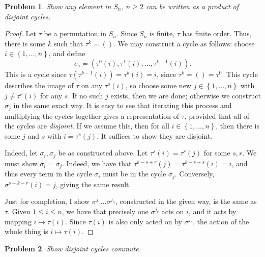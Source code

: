\documentclass[11pt, letterpaper]{article}
\theoremstyle{plain}
\newtheorem{problem}{Problem}[section]
\begin{document}
\begin{problem}
	Show any element in $S_{n} $, $n\geq 2$ can be written as a product of disjoint cycles.
\end{problem}
\begin{proof}
	Let $\tau $ be a permutation in $S_n$. Since $S_n$ is finite, $\tau$ has finite order. Thus, there is some $k$ such that $\tau ^k=( )$. We may construct a cycle as follows: choose $i\in \left\{ 1, \ldots ,n \right\} $, and define
	\[
		\sigma _i = (\tau ^0(i), \tau ^1(i), \ldots ,\tau ^{k-1} (i))
	.\]
	This is a cycle since $\tau \left( \tau ^{k-1} (i) \right) =\tau ^k(i)=i$, since $\tau ^k=( )=\tau ^0$. This cycle describes the image of $\tau $ on any $\tau ^s(i)$, so choose some new $j\in \left\{ 1, \ldots ,n \right\} $ with $j\neq \tau ^s(i)$ for any $s$. If no such $j$ exists, then we are done; otherwise we construct $\sigma _j$ in the same exact way. It is easy to see that iterating this process and multiplying the cycles together gives a representation of $\tau $, provided that all of the cycles are \emph{disjoint}. If we assume this, then for all $i\in \left\{ 1, \ldots ,n \right\} $, then there is some $j$ and $s$ with $i=\tau ^s(j)$. It suffices to show they are disjoint.

	Indeed, let $\sigma _i,\sigma _j$ be as constructed above. Let $\tau ^s(i)=\tau ^r(j)$ for some $s,r$. We must show $\sigma _i=\sigma _j$. Indeed, we have that $\tau ^{k-s+r} (j)=\tau ^{k-s+s} (i)=i$, and thus every term in the cycle $\sigma _i$ must be in the cycle $\sigma _j$. Conversely, $\sigma ^{s+k-r} (i)=j$, giving the same result.

	Just for completion, I show $\sigma ^{j_1} \ldots \sigma ^{j_h} $, constructed in the given way, is the same as $\tau $. Given $1\leq i\leq n$, we have that precisely one $\sigma^{j_r} $ acts on $i$, and it acts by mapping $i\mapsto \tau (i)$. Since $\tau (i)$ is also only acted on by $\sigma ^{j_r} $, the action of the whole thing is $i\mapsto \tau (i)$.
\end{proof}

\begin{problem}\label{6.4}
	Show disjoint cycles commute.
\end{problem}
\end{document}
